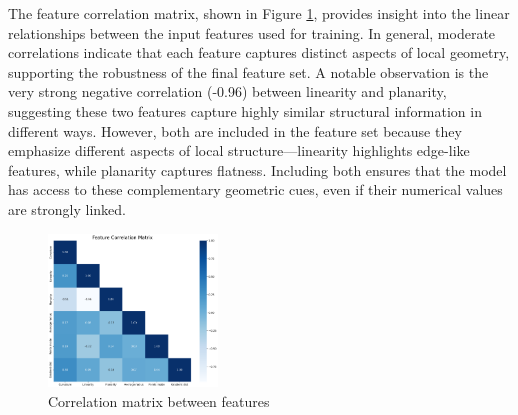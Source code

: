 The feature correlation matrix, shown in Figure \ref{fig:feature_correlation}, provides insight into the linear relationships between the input features used for training. In general, moderate correlations indicate that each feature captures distinct aspects of local geometry, supporting the robustness of the final feature set. A notable observation is the very strong negative correlation (-0.96) between linearity and planarity, suggesting these two features capture highly similar structural information in different ways. However, both are included in the feature set because they emphasize different aspects of local structure—linearity highlights edge-like features, while planarity captures flatness. Including both ensures that the model has access to these complementary geometric cues, even if their numerical values are strongly linked.
\begin{figure}[htbp]
    \centering
    \includegraphics[width=0.4\textwidth]{figures/correlation_matrix_final_lowQ.png}
    \caption{Correlation matrix between features}
    \label{fig:feature_correlation}
\end{figure}